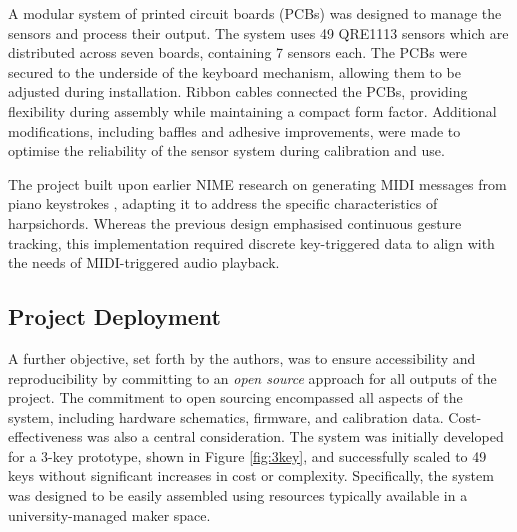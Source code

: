 

A modular system of printed circuit boards (PCBs) was designed to manage the sensors and process their output. The system uses 49 QRE1113 sensors which are distributed across seven boards, containing 7 sensors each. The PCBs were secured to the underside of the keyboard mechanism, allowing them to be adjusted during installation. Ribbon cables connected the PCBs, providing flexibility during assembly while maintaining a compact form factor. Additional modifications, including baffles and adhesive improvements, were made to optimise the reliability of the sensor system during calibration and use.

The project built upon earlier NIME research on generating MIDI messages from piano keystrokes \cite{McPherson2013}, adapting it to address the specific characteristics of harpsichords. Whereas the previous design emphasised continuous gesture tracking, this implementation required discrete key-triggered data to align with the needs of MIDI-triggered audio playback. 

\subsection{Project Deployment}
A further objective, set forth by the authors, was to ensure accessibility and reproducibility by committing to an \emph{open source} approach for all outputs of the project. The commitment to open sourcing encompassed all aspects of the system, including hardware schematics, firmware, and calibration data. Cost-effectiveness was also a central consideration. The system was initially developed for a 3-key prototype, shown in Figure \ref{fig:3key}, and successfully scaled to 49 keys without significant increases in cost or complexity. Specifically, the system was designed to be easily assembled using resources typically available in a university-managed maker space.

